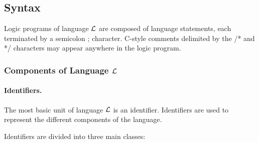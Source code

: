 \documentclass[10pt, twocolumn]{article}
\begin{document}
    \subsection{Syntax}

      Logic programs of language ${\cal L}$ are composed of language
      statements, each terminated by a semicolon ; character. C-style comments
      delimited by the /* and */ characters may appear anywhere in the logic
      program.

      \subsubsection{Components of Language $\cal{L}$}

        \paragraph{Identifiers.}
          The most basic unit of language $\cal{L}$ is an identifier.
          Identifiers are used to represent the different components of the
          language.  
    
          Identifiers are divided into three main classes:
\end{document}
